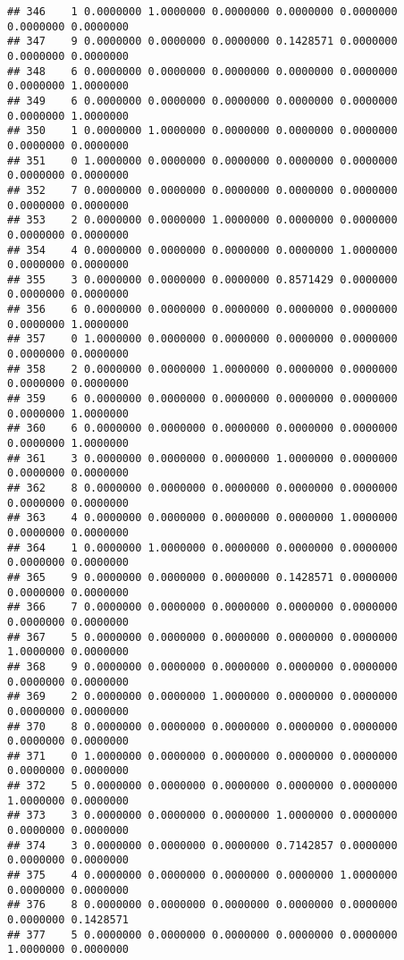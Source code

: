 \documentclass[
]{article}
\begin{document}
\begin{verbatim}
## 346    1 0.0000000 1.0000000 0.0000000 0.0000000 0.0000000 0.0000000 0.0000000
## 347    9 0.0000000 0.0000000 0.0000000 0.1428571 0.0000000 0.0000000 0.0000000
## 348    6 0.0000000 0.0000000 0.0000000 0.0000000 0.0000000 0.0000000 1.0000000
## 349    6 0.0000000 0.0000000 0.0000000 0.0000000 0.0000000 0.0000000 1.0000000
## 350    1 0.0000000 1.0000000 0.0000000 0.0000000 0.0000000 0.0000000 0.0000000
## 351    0 1.0000000 0.0000000 0.0000000 0.0000000 0.0000000 0.0000000 0.0000000
## 352    7 0.0000000 0.0000000 0.0000000 0.0000000 0.0000000 0.0000000 0.0000000
## 353    2 0.0000000 0.0000000 1.0000000 0.0000000 0.0000000 0.0000000 0.0000000
## 354    4 0.0000000 0.0000000 0.0000000 0.0000000 1.0000000 0.0000000 0.0000000
## 355    3 0.0000000 0.0000000 0.0000000 0.8571429 0.0000000 0.0000000 0.0000000
## 356    6 0.0000000 0.0000000 0.0000000 0.0000000 0.0000000 0.0000000 1.0000000
## 357    0 1.0000000 0.0000000 0.0000000 0.0000000 0.0000000 0.0000000 0.0000000
## 358    2 0.0000000 0.0000000 1.0000000 0.0000000 0.0000000 0.0000000 0.0000000
## 359    6 0.0000000 0.0000000 0.0000000 0.0000000 0.0000000 0.0000000 1.0000000
## 360    6 0.0000000 0.0000000 0.0000000 0.0000000 0.0000000 0.0000000 1.0000000
## 361    3 0.0000000 0.0000000 0.0000000 1.0000000 0.0000000 0.0000000 0.0000000
## 362    8 0.0000000 0.0000000 0.0000000 0.0000000 0.0000000 0.0000000 0.0000000
## 363    4 0.0000000 0.0000000 0.0000000 0.0000000 1.0000000 0.0000000 0.0000000
## 364    1 0.0000000 1.0000000 0.0000000 0.0000000 0.0000000 0.0000000 0.0000000
## 365    9 0.0000000 0.0000000 0.0000000 0.1428571 0.0000000 0.0000000 0.0000000
## 366    7 0.0000000 0.0000000 0.0000000 0.0000000 0.0000000 0.0000000 0.0000000
## 367    5 0.0000000 0.0000000 0.0000000 0.0000000 0.0000000 1.0000000 0.0000000
## 368    9 0.0000000 0.0000000 0.0000000 0.0000000 0.0000000 0.0000000 0.0000000
## 369    2 0.0000000 0.0000000 1.0000000 0.0000000 0.0000000 0.0000000 0.0000000
## 370    8 0.0000000 0.0000000 0.0000000 0.0000000 0.0000000 0.0000000 0.0000000
## 371    0 1.0000000 0.0000000 0.0000000 0.0000000 0.0000000 0.0000000 0.0000000
## 372    5 0.0000000 0.0000000 0.0000000 0.0000000 0.0000000 1.0000000 0.0000000
## 373    3 0.0000000 0.0000000 0.0000000 1.0000000 0.0000000 0.0000000 0.0000000
## 374    3 0.0000000 0.0000000 0.0000000 0.7142857 0.0000000 0.0000000 0.0000000
## 375    4 0.0000000 0.0000000 0.0000000 0.0000000 1.0000000 0.0000000 0.0000000
## 376    8 0.0000000 0.0000000 0.0000000 0.0000000 0.0000000 0.0000000 0.1428571
## 377    5 0.0000000 0.0000000 0.0000000 0.0000000 0.0000000 1.0000000 0.0000000

\end{verbatim}
\end{document}
